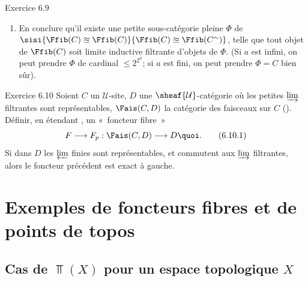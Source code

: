 \documentclass[10pt]{../fichiers-configuration-latex/smfart}
\begin{document}
\begin{enonce*}[remark]{Exercice 6.9}
\begin{enumerate}
\item En conclure qu'il existe une petite sous-catégorie pleine $\Phi$
de $\sisi{\Ffib(C)\approxeq \Ffib(C)}{\Ffib(C)\approxeq \Ffib(C^{\sim})}$, telle que tout objet de $\Ffib(C)$
soit limite inductive filtrante d'objets de $\Phi$. (Si $a$ est
infini, on peut prendre $\Phi$ de cardinal $\leq 2^{2^{a}}$; si $a$
est fini, on peut prendre $\Phi=C$ bien sûr).
\end{enumerate}
\end{enonce*}

\begin{enonce*}[remark]{Exercice 6.10}
Soient $C$ un $\mathcal{U}$-site, $D$ une
$\sheaf{\mathcal{U}}$-catégorie où les petites $\varinjlim$
filtrantes sont représentables, $\Fais(C,D)$ la catégorie des
faisceaux sur $C$  (). Définir, en
étendant , un « foncteur fibre »
\begin{equation*}
F\longrightarrow F_p:\Fais(C,D)\longrightarrow D{\quoi}.\tag{6.10.1}
\end{equation*}
Si dans $D$ les $\varprojlim$ finies sont représentables, et
commutent aux $\varinjlim$ filtrantes, alors le foncteur précédent
est exact à gauche.
\end{enonce*}

\section{Exemples de foncteurs fibres et de points de topos}\pageoriginale

\subsection{Cas de $\Top(X)$ pour un espace topologique
  $X$}
\end{document}
